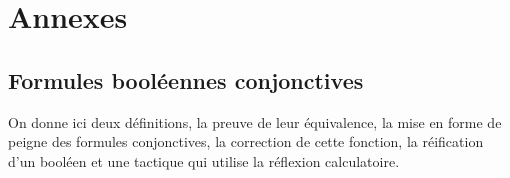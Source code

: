 \documentclass[11pt]{article}
\begin{document}
\renewcommand\refname{Bibliographie}
\nocite{*}
{}


\newpage
\pagestyle{empty}

\section{Annexes}
\subsection{Formules booléennes conjonctives} \label{annexe_peigne}

On donne ici deux définitions, la preuve de leur équivalence, la mise en forme de peigne des formules conjonctives, la correction de cette fonction, la réification d'un booléen et une tactique qui utilise la réflexion calculatoire.
\end{document}
